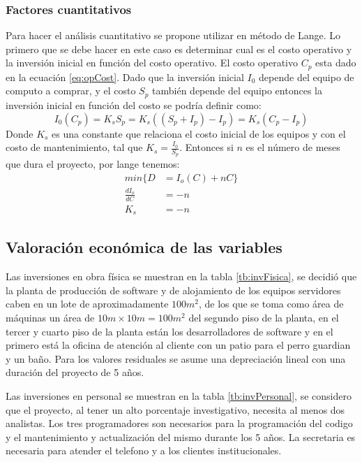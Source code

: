 \documentclass[a4paper, 12pt, oneside]{article}
\begin{document}
	\subsubsection{Factores cuantitativos}
	Para hacer el análisis cuantitativo se propone utilizar en método de Lange. Lo primero que se debe hacer en este caso es determinar cual es el costo operativo y la inversión inicial en función del costo operativo. El costo operativo $C_p$ esta dado en la ecuación \ref{eq:opCost}. Dado que la inversión inicial $I_0$ depende del equipo de computo a comprar, y el costo $S_p$ también depende del equipo entonces la inversión inicial en función del costo se podría definir como:
	\begin{equation}
		I_0(C_p) = K_sS_p = K_s((S_p+I_p) - I_p) = K_s(C_p - I_p)
		\label{eq:InvCost}
	\end{equation}
	Donde $K_s$ es una constante que relaciona el costo inicial de los equipos y con el costo de mantenimiento, tal que $K_s=\frac{I_0}{S_p}$. Entonces si $n$ es el número de meses que dura el proyecto, por lange tenemos:
	\begin{align*}
		min\{D&=I_o(C)+nC\} \\
		\frac{dI_o}{dC}&=-n \\
		K_s &= -n
	\end{align*}
	
	\subsection{Valoración económica de las variables}
	Las inversiones en obra física se muestran en la tabla \ref{tb:invFisica}, se decidió que la planta de producción de software y de alojamiento de los equipos servidores caben en un lote de aproximadamente $100m^2$, de los que se toma como área de máquinas un área de $10m \times 10m = 100m^2$ del segundo piso de la planta, en el tercer y cuarto piso de la planta están los desarrolladores de software y en el primero está la oficina de atención al cliente con un patio para el perro guardian y un baño. Para los valores residuales se asume una depreciación lineal con una duración del proyecto de 5 años.

	Las inversiones en personal se muestran en la tabla \ref{tb:invPersonal}, se considero que el proyecto, al tener un alto porcentaje investigativo, necesita al menos dos analistas. Los tres programadores son necesarios para la programación del codigo y el mantenimiento y actualización del mismo durante los 5 años. La secretaria es necesaria para atender el telefono y a los clientes institucionales.
\end{document}
